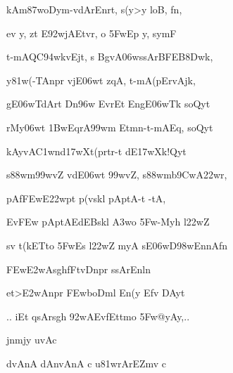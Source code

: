 \dnnemslokac 
{\dn kAm\387woDym-vdArEnrt, s\2(y>y loB, fn\4,}
\dontdisplaylinenum

\dnnemslokad 
{\dn ev\2 y, zt\? E\392wjAEtvr, o \35FwEp y, s\2ymF \vegdn\dontdisplaylinenum}


\ujvers\dnnemsloka 
{\dn t-mAQC\394wkvEj\0t, s BgvA\306ws\2sArBFEB\38Dwk,}
\dontdisplaylinenum

\dnnemslokab 
{\dn y\381w(-TAnpr\2 v\5jE\306wt zqA, t-mA(pErv\5Ajk, \dandadn\dontdisplaylinenum}

\dnnemslokac 
{\dn g\5E\306wTdArt\2 Dn\2\396w EvrEt Eng\5\0E\306wTk soQyt\?}
\dontdisplaylinenum

\dnnemslokad 
{\dn rMy\306wt\? \31BwEqrA\399wm\? Etmn-t-mAEq, soQyt\? \vegdn\dontdisplaylinenum}


\ujvers\dnnemsloka 
{\dn kAyvA\3C1wnd\317wXt(prtr-t\? dE\317wXk!Qyt\?}
\dontdisplaylinenum

\dnnemslokab 
{\dn s\388wm\0\399wvZ\2 vdE\306wt \399wvZ, s\388wm\0b\5\39CwA\322wr, \dandadn\dontdisplaylinenum}

\dnnemslokac 
{\dn pAf\3FEwE\322wpt\2 p(vskl\2 pAptA-t\? -tA,}
\dontdisplaylinenum

\dnnemslokad 
{\dn Ev\3FEw\? pAptAEdEBskl\2 \3A3wo \35Fw-Myh\2 l\322wZ \vegdn\dontdisplaylinenum}


\ujvers\dnnemsloka 
{\dn sv{\rdt} t(kETto \35FwEs l\322wZ myA sE\306wD\398wEnnA\0fn}
\dontdisplaylinenum

\dnnemslokab 
{\dn \3FEw\3E2wAs\2g\5hfFtvD\0npr\2 s\2sArEn\0ln \dandadn\dontdisplaylinenum}

\dnnemslokac 
{\dn  }
\dontdisplaylinenum

\dnnemslokad 
{\dn et>\3E2wAnpr\2 \3FEwboDml\2 En(y\2 Efv\2 DAy\0t\? \vegdn\dontdisplaylinenum}


\dnvers

{\dn 
\jump
\begin{center}
{..} iEt qsArs\2g\5h\? \392wAEv\2fEttmo \35Fw@yAy,{..}
\end{center}\vers}
\bekveg\szamveg\vfill\phpspagebreak\szam\bek{}
\thispagestyle{empty}



\jump\jump
\dnvers

{\dn jnm\?jy uvAc{\dandabdn}\dontdisplaylinenum }

{\dn d\?vAnA\2 dAnvAnA\2 c u\381wrArEZm\?v c{\dandadn} \dontdisplaylinenum}

